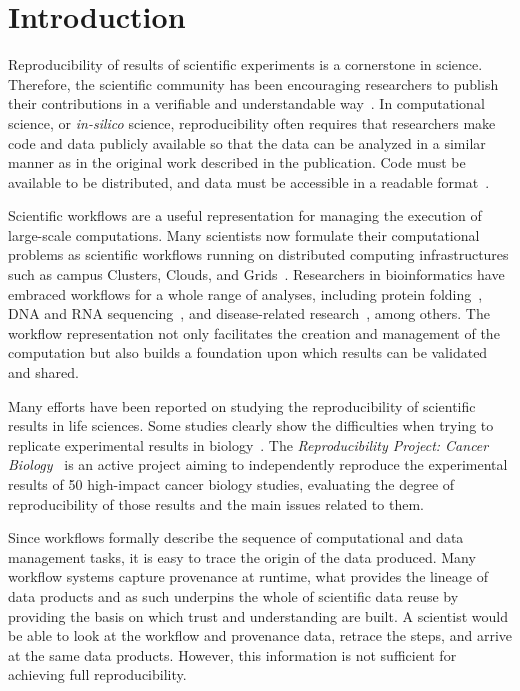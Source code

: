 \section{Introduction}

Reproducibility of results of scientific experiments is a cornerstone in 
science. Therefore, the scientific community has been encouraging researchers 
to publish their contributions in a verifiable and understandable 
way~\cite{YaleRoundtable09, James-XSEDE-2014}. In computational science, 
or \emph{in-silico} science, reproducibility often requires that researchers make 
code and data publicly available so that the data can be analyzed in a similar 
manner as in the original work described in the publication. Code must be available 
to be distributed, and data must be accessible in a readable format~\cite{bookReproducibility}. 

Scientific workflows are a useful representation for managing the execution of large-scale 
computations. Many scientists now formulate their computational problems as scientific 
workflows running on distributed computing infrastructures such as campus Clusters, 
Clouds, and Grids~\cite{workflowBook}. Researchers in bioinformatics have 
embraced workflows for a whole range of analyses, including protein folding~\cite{craddock2006science}, 
DNA and RNA sequencing~\cite{blankenberg2010galaxy, giardine2005galaxy, kepler-clotho}, 
and disease-related research~\cite{fisher2009systematic, gaizauskas2004}, among others.
The workflow representation not only facilitates the creation and management of the 
computation but also builds a foundation upon which results can be validated and 
shared. 

Many efforts have been reported on studying the reproducibility of scientific results 
in life sciences. Some studies clearly show the difficulties when trying to replicate 
experimental results in biology~\cite{Ioannidis2009}. The \emph{Reproducibility 
Project: Cancer Biology}~\cite{ErringtonCancerRerpoducibility} is an active project 
aiming to independently reproduce the experimental results of 50 high-impact cancer 
biology studies, evaluating the degree of reproducibility of those results and the main 
issues related to them.


Since workflows formally describe the sequence of computational and data 
management tasks, it is easy to trace the origin of the data produced. Many workflow 
systems capture provenance at runtime, what provides the lineage of data products 
and as such underpins the whole of scientific data reuse by providing the basis on which 
trust and understanding are built. A scientist would be able to look at the workflow and 
provenance data, retrace the steps, and arrive at the same data products. 
However, this information is not sufficient for achieving full reproducibility.

